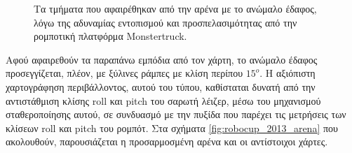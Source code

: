 \begin{figure}[!ht]
	\hspace{0.01\linewidth}
	\hspace{0.01\linewidth}
	\caption{Τα τμήματα που αφαιρέθηκαν από την αρένα με το ανώμαλο έδαφος, λόγω της αδυναμίας εντοπισμού και προσπελασιμότητας από την ρομποτική πλατφόρμα Monstertruck.}
	\label{fig:removed_parts_from_robocup_arena}
\end{figure}

\bigskip
Αφού αφαιρεθούν τα παραπάνω εμπόδια από τον χάρτη, το ανώμαλο έδαφος προσεγγίζεται, πλέον, με ξύλινες ράμπες με κλίση περίπου $15^o$. Η αξιόπιστη χαρτογράφηση περιβάλλοντος, αυτού του τύπου, καθίσταται δυνατή από την αντιστάθμιση κλίσης roll και pitch του σαρωτή λέιζερ, μέσω του μηχανισμού σταθεροποίησης αυτού, σε συνδυασμό με την πυξίδα που παρέχει τις μετρήσεις των κλίσεων roll και pitch του ρομπότ. Στα σχήματα \ref{fig:robocup_2013_arena} που ακολουθούν, παρουσιάζεται η προσαρμοσμένη αρένα και οι αντίστοιχοι χάρτες.

